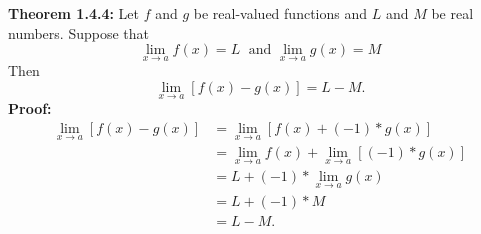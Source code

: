 \documentclass{article}
\begin{document}
	\textbf{Theorem 1.4.4:} Let $f$ and $g$ be real-valued functions and $L$ and $M$ be real numbers. Suppose that
	$$\lim_{x \to a}{f(x)} = L \; \text{ and } \lim_{x \to a}{g(x)} = M$$
	Then
	$$\lim_{x \to a}[{f(x) - g(x)}] = L - M.$$
	\textbf{Proof:}
	\begin{align*}
		\lim_{x \to a}[{f(x) - g(x)}] &= \lim_{x \to a}[{f(x) + (-1) * g(x)}] \\
									  &= \lim_{x \to a}{f(x)} + \lim_{x \to a}{[(-1) * g(x)]} \tag{Theorem 1.4.1} \\
									  &= L + (-1) * \lim_{x \to a}{g(x)} \tag{Theorem 1.4.3} \\
									  &= L + (-1) * M \\
									  &= L - M.
	\end{align*}
\end{document}
